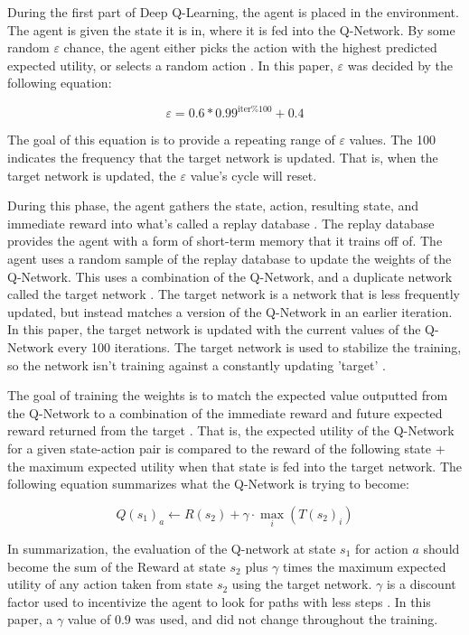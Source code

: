 \documentclass[12pt]{article}
\begin{document}
During the first part of Deep Q-Learning, the agent is placed in the environment.
The agent is given the state it is in, where it is fed into the Q-Network.
By some random $\varepsilon$ chance, the agent either picks the action with the highest predicted expected utility, or selects a random action \cite{article_reinforcement_learning_survey}.
In this paper, $\varepsilon$ was decided by the following equation:

$$\varepsilon = 0.6 * 0.99^{\text{iter} \% 100} + 0.4$$

The goal of this equation is to provide a repeating range of $\varepsilon$ values.
The 100 indicates the frequency that the target network is updated.
That is, when the target network is updated, the $\varepsilon$ value's cycle will reset.

During this phase, the agent gathers the state, action, resulting state, and immediate reward into what's called a replay database \cite{article_reinforcement_learning_for_robots}.
The replay database provides the agent with a form of short-term memory that it trains off of.
The agent uses a random sample of the replay database to update the weights of the Q-Network.
This uses a combination of the Q-Network, and a duplicate network called the target network \cite{article_human_level_control_deep_reinforcement_learning}.
The target network is a network that is less frequently updated, but instead matches a version of the Q-Network in an earlier iteration.
In this paper, the target network is updated with the current values of the Q-Network every 100 iterations.
The target network is used to stabilize the training, so the network isn't training against a constantly updating 'target' \cite{article_human_level_control_deep_reinforcement_learning}.

The goal of training the weights is to match the expected value outputted from the Q-Network to a combination of the immediate reward and future expected reward returned from the target \cite{article_reinforcement_learning_survey}.
That is, the expected utility of the Q-Network for a given state-action pair is compared to the reward of the following state + the maximum expected utility when that state is fed into the target network.
The following equation summarizes what the Q-Network is trying to become:

$$Q(s_{1})_{a} \leftarrow R(s_2) + \gamma \cdot \max_i(T(s_2)_i)$$

In summarization, the evaluation of the Q-network at state  $s_1$ for action $a$ should become the sum of the Reward at state $s_2$ plus $\gamma$ times the maximum expected utility of any action taken from state $s_2$ using the target network.
$\gamma$ is a discount factor used to incentivize the agent to look for paths with less steps \cite{article_reinforcement_learning_for_robots}.
In this paper, a $\gamma$ value of $0.9$ was used, and did not change throughout the training.
\end{document}
